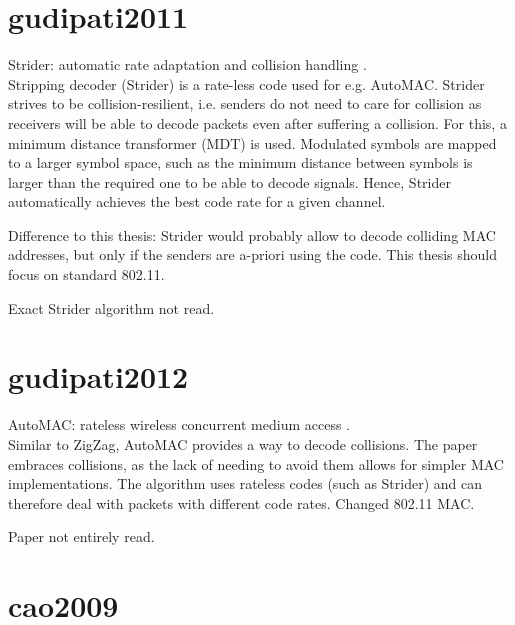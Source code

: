 
\section*{gudipati2011}

Strider: automatic rate adaptation and collision handling \cite{gudipati2011}.\\

Stripping decoder (Strider) is a rate-less code used for e.g. AutoMAC. Strider strives to be collision-resilient, i.e. senders do not need to care for collision as receivers will be able to decode packets even after suffering a collision. For this, a minimum distance transformer (MDT) is used. Modulated symbols are mapped to a larger symbol space, such as the minimum distance between symbols is larger than the required one to be able to decode signals. Hence, Strider automatically achieves the best code rate for a given channel.

Difference to this thesis: Strider would probably allow to decode colliding MAC addresses, but only if the senders are a-priori using the code. This thesis should focus on standard 802.11.

Exact Strider algorithm not read.



\section*{gudipati2012}

AutoMAC: rateless wireless concurrent medium access \cite{gudipati2012}.\\

Similar to ZigZag, AutoMAC provides a way to decode collisions. The paper embraces collisions, as the lack of needing to avoid them allows for simpler MAC implementations. The algorithm uses rateless codes (such as Strider) and can therefore deal with packets with different code rates. Changed 802.11 MAC.

Paper not entirely read.



\section*{cao2009}

